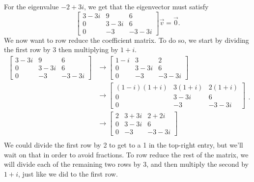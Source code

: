 \begin{exampleSol}
For the eigenvalue $-2 + 3i$, we get that the eigenvector must satisfy
\[ \begin{bmatrix} 3 - 3i & 9 & 6 \\ 0 & 3-3i & 6 \\ 0 & -3 & -3-3i \end{bmatrix} \vec{v} = \vec{0}. \] We now want to row reduce the coefficient matrix. To do so, we start by dividing the first row by 3 then multiplying by $1+i$. 
\[ \begin{split}
\begin{bmatrix} 3 - 3i & 9 & 6 \\ 0 & 3-3i & 6 \\ 0 & -3 & -3-3i \end{bmatrix} &\rightarrow \begin{bmatrix} 1 - i & 3 & 2 \\ 0 & 3-3i & 6 \\ 0 & -3 & -3-3i \end{bmatrix} \\
&\rightarrow \begin{bmatrix} (1 - i)(1+i) & 3(1+i) & 2(1+i) \\ 0 & 3-3i & 6 \\ 0 & -3 & -3-3i \end{bmatrix}\\
&\rightarrow \begin{bmatrix} 2 & 3+3i & 2+2i \\ 0 & 3-3i & 6 \\ 0 & -3 & -3-3i \end{bmatrix}\\
\end{split}. \] We could divide the first row by 2 to get to a 1 in the top-right entry, but we'll wait on that in order to avoid fractions. To row reduce the rest of the matrix, we will divide each of the remaining two rows by 3, and then multiply the second by $1+i$, just like we did to the first row. 


\end{exampleSol}
